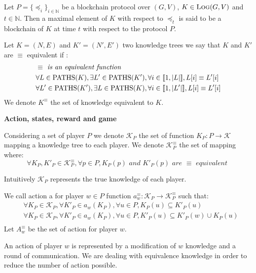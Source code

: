 \begin{mydef}
Let $P = \{ \preceq_i\}_{i \in \mathbb{N}}$ be a blockchain protocol over $(G,V)$, $K \in \text{\sc Log}(G,V)$ and $t \in \mathbb{N}$. 
Then a maximal element of $K$ with respect to $\preceq_t$ is said to be a blockchain of $K$ at time $t$ with respect to the protocol $P$.
\end{mydef}



\begin{mydef}
	Let $K = (N,E)$ and $K'=(N',E')$ two knowledge trees we say that $K$ and $K'$ are $\equiv$ equivalent if :
	\begin{eqnarray*}
		& \equiv \textit{ is an equivalent function} \\
		& \forall L \in \text{PATHS}(K), \exists L' \in \text{PATHS}(K'), \forall i \in \llbracket 1,|L| \rrbracket, L[i] \equiv L'[i] \\
		& \forall L' \in \text{PATHS}(K'), \exists L \in \text{PATHS}(K), \forall i \in \llbracket 1,|L'| \rrbracket, L[i] \equiv L'[i] \\
	\end{eqnarray*}	
	We denote $K^{\equiv}$ the set of knowledge equivalent to $K$. 
\end{mydef}


\medskip
\noindent
\textbf{Action, states, reward and game}
\begin{mydef}
	Considering a set of player $P$ we denote $\mathcal{K}_P$ the set of function $K_P : P \rightarrow \mathcal{K}$ mapping a knowledge tree to each player. 
	We denote $\mathcal{K}^{\equiv}_P$ the set of mapping where:
	$$\forall K_P, K'_P \in \mathcal{K}^{\equiv}_P, \forall p \in P, K_P(p) \textit{ and } K'_P(p) \textit{ are } \equiv \textit{ equivalent } $$ 
\end{mydef}

Intuitively $\mathcal{K}_P$ represents the true knowledge of each player.

\begin{mydef}
	We call action a for player $w\in P$ function $a^\equiv_w: \mathcal{K}_P \rightarrow \mathcal{K}_P^{\equiv}$ such that: 
	\begin{eqnarray*}	
		&\forall K_P \in \mathcal{K}_P, \forall K'_P \in a_w(K_P),  \forall u \in P, K_P(u) \subseteq K'_P(u)  \\
		&\forall K_P \in \mathcal{K}_P, \forall K'_P \in a_w(K_P), \forall u \in P, K'_P(u) \subseteq K'_P(w) \cup K_P(u)  \\
	\end{eqnarray*}
	Let $A^\equiv_w$ be the set of action for player $w$.
\end{mydef}
An action of player $w$ is represented by a modification of $w$ knowledge and a round of communication. We are dealing with equivalence knowledge in order to reduce the number of action possible.

